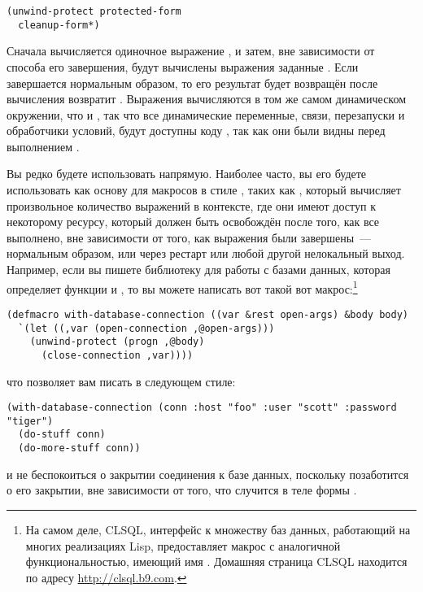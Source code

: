 \begin{lstlisting}
(unwind-protect protected-form
  cleanup-form*)
\end{lstlisting}

Сначала вычисляется одиночное выражение , и затем, вне зависимости от
способа его завершения, будут вычислены выражения заданные .  Если
 завершается нормальным образом, то его результат будет возвращён
 после вычисления возвратит . Выражения
 вычисляются в том же самом динамическом окружении, что и
, так что все динамические переменные, связи, перезапуски и
обработчики условий, будут доступны коду , так как они были видны
перед выполнением .

Вы редко будете использовать  напрямую.  Наиболее часто, вы его
будете использовать как основу для макросов в стиле , таких как
, который вычисляет произвольное количество выражений в контексте,
где они имеют доступ к некоторому ресурсу, который должен быть освобождён после того, как
все выполнено, вне зависимости от того, как выражения были завершены~--- нормальным
образом, или через рестарт или любой другой нелокальный выход.  Например, если вы пишете
библиотеку для работы с базами данных, которая определяет функции  и
, то вы можете написать вот такой вот макрос:\footnote{На самом
  деле, CLSQL, интерфейс к множеству баз данных, работающий на многих реализациях Lisp,
  предоставляет макрос с аналогичной функциональностью, имеющий имя .
  Домашняя страница CLSQL находится по адресу \url{http://clsql.b9.com}.}

\begin{lstlisting}
(defmacro with-database-connection ((var &rest open-args) &body body)
  `(let ((,var (open-connection ,@open-args)))
    (unwind-protect (progn ,@body)
      (close-connection ,var))))
\end{lstlisting}

что позволяет вам писать в следующем стиле:

\begin{lstlisting}
(with-database-connection (conn :host "foo" :user "scott" :password "tiger")
  (do-stuff conn)
  (do-more-stuff conn))
\end{lstlisting}

и не беспокоиться о закрытии соединения к базе данных, поскольку 
позаботится о его закрытии, вне зависимости от того, что случится в теле формы
.

